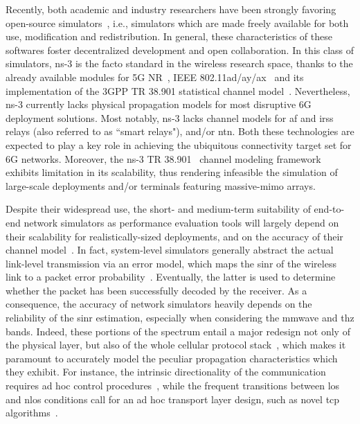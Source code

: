 Recently, both academic and industry researchers have been strongly favoring open-source simulators~\cite{10465179}, i.e., simulators which are made freely available for both use, modification and redistribution. In general, these characteristics of these softwares foster decentralized development and open collaboration.
In this class of simulators, ns-3 is the facto standard in the wireless research space, thanks to the already available modules for 5G NR~\cite{mezzavilla2018end, patriciello2019e2e}, IEEE 802.11ad/ay/ax~\cite{magrinValid2021, 10.1145/3460797.3460799, 7461452} and its implementation of the 3GPP TR 38.901 statistical channel model~\cite{zugno2020implementation}.
Nevertheless, ns-3 currently lacks physical propagation models for most disruptive 6G deployment solutions. Most notably, ns-3 lacks channel models for \gls{af} and \glspl{irs} relays (also referred to as ``smart relays"), and/or \gls{ntn}. Both these technologies are expected to play a key role in achieving the ubiquitous connectivity target set for 6G networks.
Moreover, the ns-3 TR 38.901~\cite{3gpp.38.901} channel modeling framework exhibits limitation in its scalability, thus rendering infeasible the simulation of large-scale deployments and/or terminals featuring massive-\gls{mimo} arrays.

Despite their widespread use, the short- and medium-term suitability of end-to-end network simulators as performance evaluation tools will largely depend on their scalability for realistically-sized deployments, and on the accuracy of their channel model~\cite{testolina2020scalable}.
In fact, system-level simulators generally abstract the actual link-level transmission via an error model, which maps the \gls{sinr} of the wireless link to a packet error probability~\cite{lagen2020new}. Eventually, the latter is used to determine whether the packet has been successfully decoded by the receiver. As a consequence, the accuracy of network simulators heavily depends on the reliability of the \gls{sinr} estimation, especially when considering the \gls{mmwave} and \gls{thz} bands. 
Indeed, these portions of the spectrum entail a major redesign not only of the physical layer, but also of the whole cellular protocol stack~\cite{shafi2018microwave}, which makes it paramount to accurately model the peculiar propagation characteristics which they exhibit. For instance, the intrinsic directionality of the communication requires ad hoc control procedures~\cite{heng2021six}, while the frequent transitions between \gls{los} and \gls{nlos} conditions call for an ad hoc transport layer design, such as novel \gls{tcp} algorithms~\cite{zhang2019will}.

